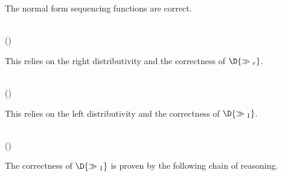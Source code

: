 The normal form sequencing functions are correct.
\begin{hscode}\SaveRestoreHook
{}%
%
%
\>[B]{}\;\mathbin{:}\;\;\;\;\;{}\<[E]%
\\
\>[B]{}\<[4]%
\>[4]{}\;\;\C{\seq}\;\;\;\;\;(\;\;){}\<[E]%
\ColumnHook
\end{hscode}\resethooks
This relies on the right distributivity and the correctness of \ensuremath{\D{\seq{}_r}}.
\begin{hscode}\SaveRestoreHook
{}%
%
%
\>[B]{}\;\mathbin{:}\;\;\;\;\;{}\<[E]%
\\
\>[B]{}\<[4]%
\>[4]{}\;\;\C{\seq}\;\;\;\;\;(\;\;){}\<[E]%
\ColumnHook
\end{hscode}\resethooks
This relies on the left distributivity and the correctness of \ensuremath{\D{\seq{}_1}}.
\begin{hscode}\SaveRestoreHook
{}%
%
%
\>[B]{}\;\mathbin{:}\;\;\;\;\;{}\<[E]%
\\
\>[B]{}\<[4]%
\>[4]{}\;\;\C{\seq}\;\;\;\;\;(\;\;){}\<[E]%
\ColumnHook
\end{hscode}\resethooks
The correctness of \ensuremath{\D{\seq{}_1}} is proven by the following chain of reasoning.
